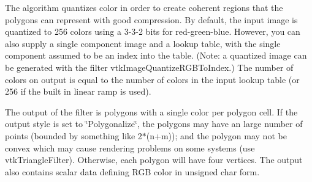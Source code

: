 The algorithm quantizes color in order to create coherent regions that the polygons can represent with good compression. By default, the input image is quantized to 256 colors using a 3-\/3-\/2 bits for red-\/green-\/blue. However, you can also supply a single component image and a lookup table, with the single component assumed to be an index into the table. (Note\-: a quantized image can be generated with the filter vtk\-Image\-Quantize\-R\-G\-B\-To\-Index.) The number of colors on output is equal to the number of colors in the input lookup table (or 256 if the built in linear ramp is used).

The output of the filter is polygons with a single color per polygon cell. If the output style is set to \char`\"{}\-Polygonalize\char`\"{}, the polygons may have an large number of points (bounded by something like 2$\ast$(n+m)); and the polygon may not be convex which may cause rendering problems on some systems (use vtk\-Triangle\-Filter). Otherwise, each polygon will have four vertices. The output also contains scalar data defining R\-G\-B color in unsigned char form.

